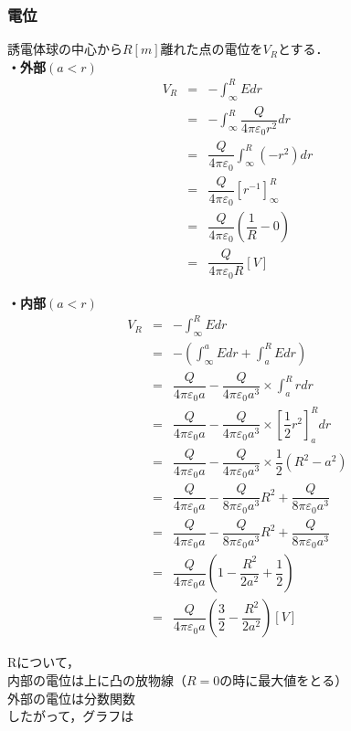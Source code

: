 \subsubsection{電位}
誘電体球の中心から$R[m]$離れた点の電位を$V_R$とする．\\
{\bf ・外部$(a < r)$}\\
\begin{eqnarray}
V_{R}&=&-\int ^{R}_{\infty }Edr\\
&=&-\int ^{R}_{\infty }\dfrac {Q}{4\pi \varepsilon _{0}r^{2}}dr\\
&=&\dfrac {Q}{4\pi \varepsilon _{0}}\int ^{R}_{\infty }\left( -r^{2}\right) dr\\
&=&\dfrac {Q}{4\pi \varepsilon _{0}}\left[ r^{-1}\right] ^{R}_{\infty }\\
&=&\dfrac {Q}{4\pi \varepsilon _{0}}\left( \dfrac {1}{R}-0\right) \\
&=&\dfrac {Q}{4\pi \varepsilon _{0}R}\left[ V\right]
\end{eqnarray}

{\bf ・内部$(a < r)$}\\
\begin{eqnarray}
  V_{R}&=&-\int ^{R}_{\infty }Edr\\
  &=&-\left( \int ^{a}_{\infty }Edr+\int ^{R}_{a}Edr\right) \\
  &=&\dfrac {Q}{4\pi \varepsilon _{0}a}-\dfrac {Q}{4\pi \varepsilon _{0}a^{3}}\times \int ^{R}_{a}rdr\\
  &=&\dfrac {Q}{4\pi \varepsilon _{0}a}-\dfrac {Q}{4\pi \varepsilon _{0}a^{3}}\times \left[ \dfrac {1}{2}r^{2}\right] ^{R}_{a}dr\\
  &=&\dfrac {Q}{4\pi \varepsilon _{0}a}-\dfrac {Q}{4\pi \varepsilon _{0}a^{3}}\times \dfrac {1}{2}\left( R^{2}-a^{2}\right)\\
  &=&\dfrac {Q}{4\pi \varepsilon _{0}a}-\dfrac {Q}{8\pi \varepsilon _{0}a^{3}}R^{2}+\dfrac {Q}{8\pi \varepsilon _{0}a^{3}}\\
  &=&\dfrac {Q}{4\pi \varepsilon _{0}a}-\dfrac {Q}{8\pi \varepsilon _{0}a^{3}}R^{2}+\dfrac {Q}{8\pi \varepsilon _{0}a^{3}}\\
  &=&\dfrac {Q}{4\pi \varepsilon _{0}a}\left( 1-\dfrac {R^{2}}{2a^{2}}+\dfrac {1}{2}\right)\\
  &=&\dfrac {Q}{4\pi \varepsilon _{0}a}\left( \dfrac {3}{2}-\dfrac {R^{2}}{2a^{2}}\right) \left[ V\right]
\end{eqnarray}

Rについて，\\
内部の電位は上に凸の放物線（$R=0$の時に最大値をとる）\\
外部の電位は分数関数\\
したがって，グラフは

